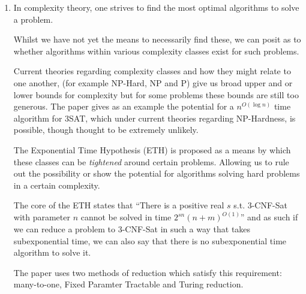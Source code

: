 \documentclass{article}
\begin{document}
\begin{enumerate}
\begin{enumerate}
        \end{enumerate}
\newpage
  \item

        In complexity theory, one strives to find the most optimal algorithms to solve a problem.

        Whilst we have not yet the means to necessarily find these, we can posit as to whether algorithms within various complexity classes exist for such problems.

        Current theories regarding complexity classes and how they might relate to one another, (for example NP-Hard, NP and P) give us broad upper and or lower bounds for complexity but for some problems these bounds are still too generous. The paper gives as an example the potential for a $n^{O(\log n)}$ time algorithm for 3SAT, which under current theories regarding NP-Hardness, is possible, though thought to be extremely unlikely.

        The Exponential Time Hypothesis (ETH) is proposed as a means by which these classes can be \textit{tightened} around certain problems. Allowing us to rule out the possibility or show the potential for algorithms solving hard problems in a certain complexity.

        The core of the ETH states that ``There is a positive real $s$ s.t. 3-CNF-Sat with parameter $n$ cannot be solved in time $2^{sn}(n+m)^{O(1)}$'' and as such if we can reduce a problem to 3-CNF-Sat in such a way that takes subexponential time, we can also say that there is no subexponential time algorithm to solve it.

        The paper uses two methods of reduction which satisfy this requirement: many-to-one, Fixed Paramter Tractable and Turing reduction.

\end{enumerate}
\end{document}
